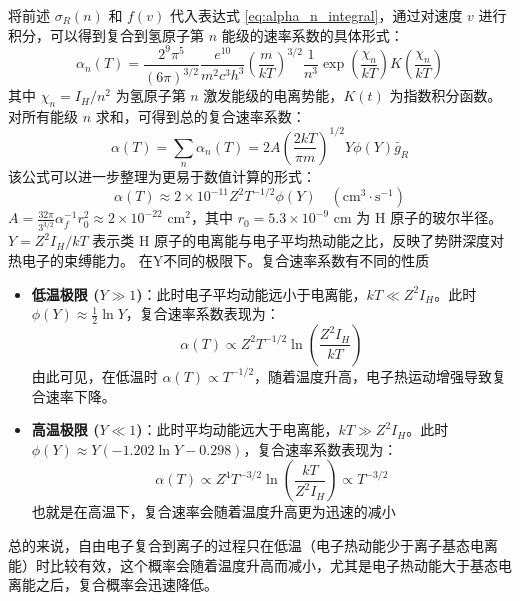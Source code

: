 将前述 $\sigma_R(n)$ 和 $f(v)$ 代入表达式 \eqref{eq:alpha_n_integral}，通过对速度 $v$ 进行积分，可以得到复合到氢原子第 $n$ 能级的速率系数的具体形式：
\begin{equation}
    \alpha_n(T) = \frac{2^9 \pi^5}{(6\pi )^{3/2}} \frac{e^{10}}{m^2 c^3 h^3} \left( \frac{m}{kT} \right)^{3/2} \frac{1}{n^3} \exp\left( \frac{\chi_n}{kT} \right) K\left( \frac{\chi_n}{kT} \right)
\end{equation}
其中 $\chi_n = I_H/n^2$ 为氢原子第 $n$ 激发能级的电离势能，$K(t)$ 为指数积分函数。对所有能级 $n$ 求和，可得到总的复合速率系数：
\begin{equation}
    \alpha(T) = \sum_{n} \alpha_n(T) = 2A \left( \frac{2kT}{\pi m} \right)^{1/2} Y \phi(Y) \bar{g}_R
\end{equation}
该公式可以进一步整理为更易于数值计算的形式：
\begin{equation}
    \alpha(T) \approx 2 \times 10^{-11} Z^2 T^{-1/2} \phi(Y) \quad (\text{cm}^3 \cdot \text{s}^{-1})
\end{equation}
$A = \frac{32\pi}{3^{3/2}} \alpha_f^{-1} r_0^2 \approx 2 \times 10^{-22} \text{ cm}^2$，其中 $r_0 = 5.3 \times 10^{-9} \text{ cm}$ 为 H 原子的玻尔半径。
$Y = Z^2 I_H / kT$ 表示类 H 原子的电离能与电子平均热动能之比，反映了势阱深度对热电子的束缚能力。
在Y不同的极限下。复合速率系数有不同的性质
\begin{itemize}
    \item \textbf{低温极限 ($Y \gg 1$)}：此时电子平均动能远小于电离能，$kT \ll Z^2 I_H$。此时 $\phi(Y) \approx \frac{1}{2} \ln Y$，复合速率系数表现为：
    \begin{equation}
        \alpha(T) \propto Z^2 T^{-1/2} \ln \left( \frac{Z^2 I_H}{kT} \right) \nonumber
    \end{equation}
    由此可见，在低温时 $\alpha(T) \propto T^{-1/2}$，随着温度升高，电子热运动增强导致复合速率下降。
    \item \textbf{高温极限 ($Y \ll 1$)}：此时平均动能远大于电离能，$kT \gg Z^2 I_H$。此时 $\phi(Y) \approx Y(-1.202 \ln Y - 0.298)$，复合速率系数表现为：
    \begin{equation}
        \alpha(T) \propto Z^4 T^{-3/2} \ln \left( \frac{kT}{Z^2 I_H} \right) \propto T^{-3/2} \nonumber
    \end{equation}
    也就是在高温下，复合速率会随着温度升高更为迅速的减小
\end{itemize}
总的来说，自由电子复合到离子的过程只在低温（电子热动能少于离子基态电离能）时比较有效，这个概率会随着温度升高而减小，尤其是电子热动能大于基态电离能之后，复合概率会迅速降低。

